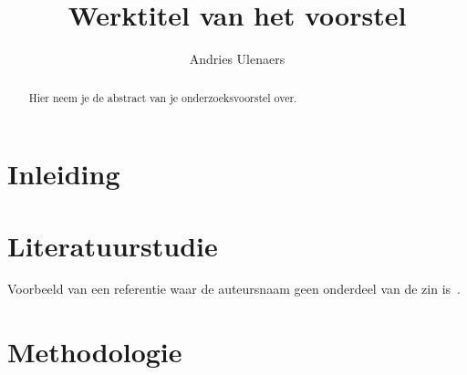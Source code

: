 \documentclass{hogent-article}
\title{Werktitel van het voorstel}
\author{Andries Ulenaers}
\begin{document}
\begin{abstract}
  Hier neem je de abstract van je onderzoeksvoorstel over.
\end{abstract}

\tableofcontents

\bigskip





\section{Inleiding}%
\label{sec:inleiding}


\lipsum[1-3]

\section{Literatuurstudie}%
\label{sec:literatuurstudie}


Voorbeeld van een referentie waar de auteursnaam geen onderdeel van de zin is~\autocite{Moore2002}.

\lipsum[4-9]

\section{Methodologie}%
\label{sec:methodologie}
\end{document}
